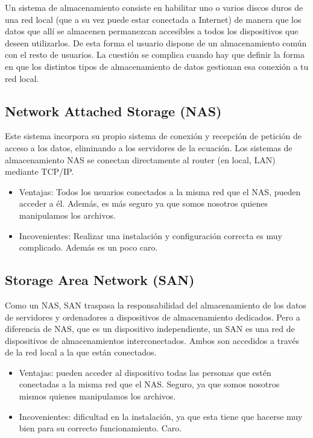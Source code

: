 Un sistema de almacenamiento consiste en habilitar uno o varios discos duros de una red local (que a su vez puede estar conectada a Internet) de manera que los datos que allí se almacenen permanezcan accesibles a todos los dispositivos que deseen utilizarlos. De esta forma el usuario dispone de un almacenamiento común con el resto de usuarios.
La cuestión se complica cuando hay que definir la forma en que los distintos tipos de almacenamiento de datos gestionan esa conexión a tu red local.

\subsection{Network Attached Storage (NAS)}

Este sistema incorpora su propio sistema de conexión y recepción de petición de acceso a los datos, eliminando a los servidores de la ecuación. Los sistemas de almacenamiento NAS se conectan directamente al router (en local, LAN) mediante TCP/IP.

\begin{itemize}
\item Ventajas: Todos los usuarios conectados a la misma red que el NAS, pueden acceder a él. Además, es más seguro ya que somos nosotros quienes manipulamos los archivos.
\item Incovenientes: Realizar una instalación y configuración correcta es muy complicado. Además es un poco caro.
\end{itemize}
\subsection{Storage Area Network (SAN)}


Como un NAS, SAN traspasa la responsabilidad del almacenamiento de los datos de servidores y ordenadores a dispositivos de almacenamiento dedicados. Pero a diferencia de NAS, que es un dispositivo independiente, un SAN es una red de dispositivos de almacenamientos interconectados. Ambos son accedidos a través de la red local a la que están conectados.

\begin{itemize}
\item Ventajas: pueden acceder al dispositivo todas las personas que estén conectadas a la misma red que el NAS. Seguro, ya que somos nosotros mismos quienes manipulamos los archivos.
\item Incovenientes: dificultad en la instalación, ya que esta tiene que hacerse muy bien para su correcto funcionamiento. Caro.
\end{itemize}

